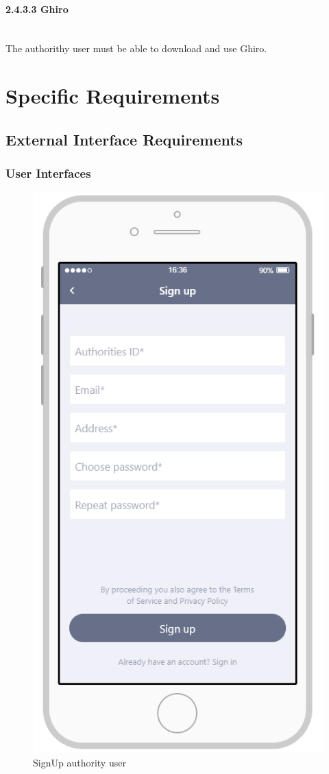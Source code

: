 \documentclass{article}
\begin{document}
\paragraph{2.4.3.3 Ghiro}\mbox{}\\
The authorithy user must be able to download and use Ghiro.
\newpage
\section{Specific Requirements}
\subsection{External Interface Requirements}
\subsubsection{User Interfaces}
\begin{figure}[H]
    \centering
    \includegraphics[scale=0.7]{Images/SignUpAuthoritiesApp}
    \caption{SignUp authority user}
\end{figure}
\end{document}
